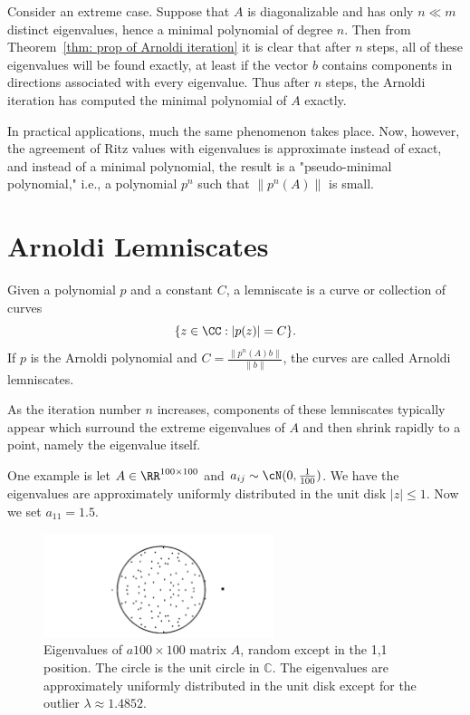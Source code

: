 Consider an extreme case. Suppose that $A$ is diagonalizable and has only $n \ll m$ distinct eigenvalues, hence a minimal polynomial of degree $n$. Then from Theorem~\ref{thm: prop of Arnoldi iteration} it is clear that after $n$ steps, all of these eigenvalues will be found exactly, at least if the vector $b$ contains components in directions associated with every eigenvalue. Thus after $n$ steps, the Arnoldi iteration has computed the minimal polynomial of $A$ exactly.

In practical applications, much the same phenomenon takes place. Now, however, the agreement of Ritz values with eigenvalues is approximate instead of exact, and instead of a minimal polynomial, the result is a "pseudo-minimal polynomial," i.e., a polynomial $p^n$ such that $\left\|p^n(A)\right\|$ is small.


\section{Arnoldi Lemniscates}

\begin{definition}
[Lemniscate]
\label{def: Lemniscate}
Given a polynomial $ p $ and a constant $ C $,  a lemniscate is a curve or collection of curves 
\[
    \{z\in \CC: |p(z)| = C\}.  
\]
If $ p$ is the Arnoldi polynomial and $ C = \frac{\|p^{n}(A)b\|}{\|b\|} $, the curves are called Arnoldi lemniscates. 
\end{definition}

As the iteration number $ n $ increases, components of these lemniscates typically appear which surround the extreme eigenvalues of $ A $ and then shrink rapidly to a point, namely the eigenvalue itself.  

One example is let $ A \in \RR^{100\times 100} $ and $ a_{ij}\sim \cN(0, \frac{1}{100}) $.  We have the eigenvalues are approximately uniformly distributed in the unit disk $ |z|\le 1 $.  Now we set $ a_{11} = 1.5 $. 

\begin{figure}[H]
    \centering
    \includegraphics[width=0.6\textwidth]{figures/33-1.png}
    \caption{Eigenvalues of $a 100 \times 100$ matrix $A$, random except in the 1,1 position. The circle is the unit circle in $\mathbb{C}$. The eigenvalues are approximately uniformly distributed in the unit disk except for the outlier $\lambda \approx 1.4852$.}
\end{figure}


